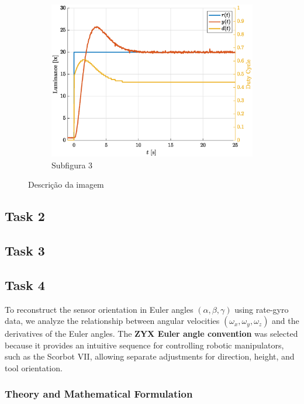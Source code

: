 \documentclass[12pt]{article}
\begin{document}
\begin{figure}[H]
\begin{subfigure}{0.33\textwidth}
        \includegraphics[width=\linewidth]{Imagens/Subimage3.eps}
        \caption{Subfigura 3}
        \label{fig:2.3}
    \end{subfigure}
    \caption{Descrição da imagem}
    \label{fig:2}
\end{figure}

\subsection{Task 2}


\subsection{Task 3}


\subsection{Task 4}

To reconstruct the sensor orientation in Euler angles \((\alpha, \beta, \gamma)\) using rate-gyro data, we analyze the relationship between angular velocities \((\omega_x, \omega_y, \omega_z)\) and the derivatives of the Euler angles. The \textbf{ZYX Euler angle convention} was selected because it provides an intuitive sequence for controlling robotic manipulators, such as the Scorbot VII, allowing separate adjustments for direction, height, and tool orientation.

\subsubsection{Theory and Mathematical Formulation}
\end{document}
